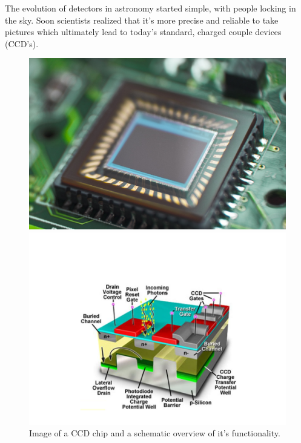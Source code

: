 The evolution of detectors in astronomy started simple, with people locking in the sky. Soon scientists realized that it's more precise and reliable to take pictures which ultimately lead to today's standard, charged couple devices (CCD's). \\
\begin{figure}[H]
\vspace{-1cm}
\begin{minipage}{0.4\textwidth}
\hspace{0.7cm}
		\includegraphics[scale = 0.48]{figures/Introduction/ccd1}
\end{minipage}
\begin{minipage}{0.4\textwidth}
\vspace{-1cm}
		\includegraphics[scale=0.35]{figures/Introduction/ccd2}
\end{minipage}
\caption{Image of a CCD chip and a schematic overview of it's functionality.} 
\end{figure} 


